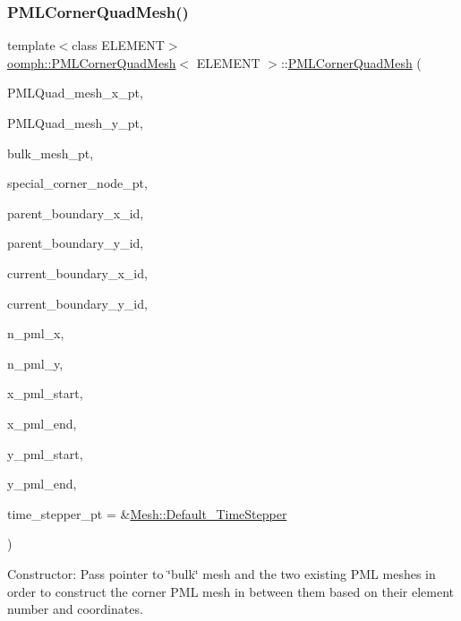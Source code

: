 \subsubsection{\texorpdfstring{P\+M\+L\+Corner\+Quad\+Mesh()}{PMLCornerQuadMesh()}}
{\footnotesize\ttfamily template$<$class E\+L\+E\+M\+E\+NT$>$ \\
\hyperlink{classoomph_1_1PMLCornerQuadMesh}{oomph\+::\+P\+M\+L\+Corner\+Quad\+Mesh}$<$ E\+L\+E\+M\+E\+NT $>$\+::\hyperlink{classoomph_1_1PMLCornerQuadMesh}{P\+M\+L\+Corner\+Quad\+Mesh} (\begin{DoxyParamCaption}\item[{\hyperlink{classoomph_1_1Mesh}{Mesh} $\ast$}]{P\+M\+L\+Quad\+\_\+mesh\+\_\+x\+\_\+pt,  }\item[{\hyperlink{classoomph_1_1Mesh}{Mesh} $\ast$}]{P\+M\+L\+Quad\+\_\+mesh\+\_\+y\+\_\+pt,  }\item[{\hyperlink{classoomph_1_1Mesh}{Mesh} $\ast$}]{bulk\+\_\+mesh\+\_\+pt,  }\item[{\hyperlink{classoomph_1_1Node}{Node} $\ast$}]{special\+\_\+corner\+\_\+node\+\_\+pt,  }\item[{const unsigned \&}]{parent\+\_\+boundary\+\_\+x\+\_\+id,  }\item[{const unsigned \&}]{parent\+\_\+boundary\+\_\+y\+\_\+id,  }\item[{const unsigned \&}]{current\+\_\+boundary\+\_\+x\+\_\+id,  }\item[{const unsigned \&}]{current\+\_\+boundary\+\_\+y\+\_\+id,  }\item[{const unsigned \&}]{n\+\_\+pml\+\_\+x,  }\item[{const unsigned \&}]{n\+\_\+pml\+\_\+y,  }\item[{const double \&}]{x\+\_\+pml\+\_\+start,  }\item[{const double \&}]{x\+\_\+pml\+\_\+end,  }\item[{const double \&}]{y\+\_\+pml\+\_\+start,  }\item[{const double \&}]{y\+\_\+pml\+\_\+end,  }\item[{\hyperlink{classoomph_1_1TimeStepper}{Time\+Stepper} $\ast$}]{time\+\_\+stepper\+\_\+pt = {\ttfamily \&\hyperlink{classoomph_1_1Mesh_a12243d0fee2b1fcee729ee5a4777ea10}{Mesh\+::\+Default\+\_\+\+Time\+Stepper}} }\end{DoxyParamCaption})\hspace{0.3cm}{\ttfamily [inline]}}



Constructor\+: Pass pointer to \char`\"{}bulk\char`\"{} mesh and the two existing P\+ML meshes in order to construct the corner P\+ML mesh in between them based on their element number and coordinates. 

